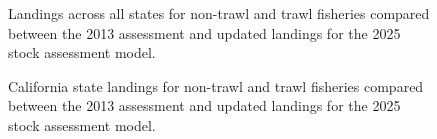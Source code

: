 \documentclass[
]{scrartcl}
\begin{document}
\begin{figure}[H]


\caption{\label{fig-Ct_All}Landings across all states for non-trawl and
trawl fisheries compared between the 2013 assessment and updated
landings for the 2025 stock assessment model.}

\end{figure}%

\begin{figure}[H]


\caption{\label{fig-Ct_CA}California state landings for non-trawl and
trawl fisheries compared between the 2013 assessment and updated
landings for the 2025 stock assessment model.}

\end{figure}%
\end{document}
